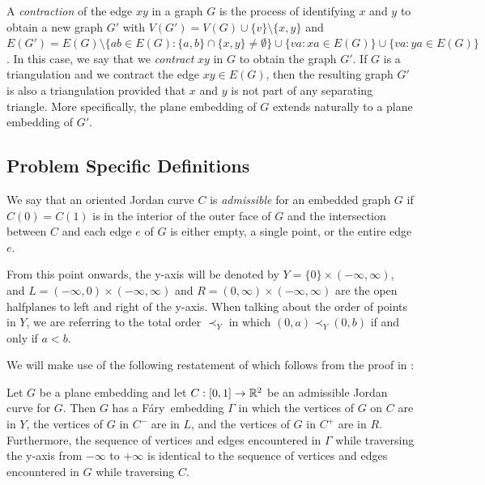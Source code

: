 \documentclass{patmorin}
\newcommand{\Fary}{Fáry}
\begin{document}
A \emph{contraction} of the edge $xy$ in a graph $G$ is the
process of identifying $x$ and $y$ to obtain a new graph $G'$ with
$V(G')=V(G)\cup\{v\}\setminus\{x,y\}$ and $E(G')=E(G)\setminus\{ab\in
E(G): \{a,b\}\cap\{x,y\}\neq\emptyset\}\cup\{va: xa\in E(G)\}\cup
\{va:ya\in E(G)\}$.  In this case, we say that we \emph{contract} $xy$
in $G$ to obtain the graph $G'$.  If $G$ is a triangulation and we
contract the edge $xy\in E(G)$, then the resulting graph $G'$ is also
a triangulation provided that $x$ and $y$ is not part of any separating
triangle. More specifically, the plane embedding of $G$ extends naturally
to a plane embedding of $G'$.

\subsection{Problem Specific Definitions}

We say that an oriented Jordan curve $C$ is \emph{admissible} for an
embedded graph $G$ if $C(0)=C(1)$ is in the interior of the outer face
of $G$ and the intersection between $C$ and each edge $e$ of $G$ is
either empty, a single point, or the entire edge $e$.  

From this point onwards, the y-axis will be denoted by
$Y=\{0\}\times(-\infty,\infty)$, and $L=(-\infty,0)\times(-\infty,\infty)$
and $R=(0,\infty)\times(-\infty,\infty)$ are the open halfplanes to left
and right of the y-axis. When talking about the order of points in $Y$,
we are referring to the total order $\prec_Y$ in which $(0,a) \prec_Y (0,b)$
if and only if $a<b$.



We will make use of the following restatement of 
which follows from the proof in \cite{dalozzo.dujmovic.ea:drawing}:
\begin{thm}
   Let $G$ be a plane embedding and let $C:[0,1]\to\mathbb{R}^2$ be an admissible
   Jordan curve for $G$.  Then $G$ has a \Fary\ embedding $\Gamma$
   in which the vertices of $G$ on $C$ are in $Y$, the vertices of
   $G$ in $C^-$ are in $L$, and the vertices of $G$ in $C^+$ are in
   $R$. Furthermore, the sequence of vertices and edges encountered in
   $\Gamma$ while traversing the y-axis from $-\infty$ to $+\infty$ is
   identical to the sequence of vertices and edges encountered in $G$
   while traversing $C$.
\end{thm}
\end{document}
